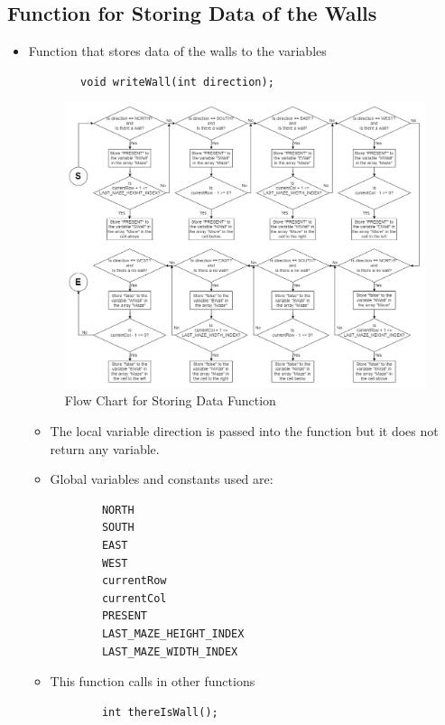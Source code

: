 \documentclass[11pt]{article}
\begin{document}
\subsection{Function for Storing Data of the Walls}
\begin{itemize}
\item Function that stores data of the walls to the variables
	\begin{verbatim}
		void writeWall(int direction);
	\end{verbatim}
\begin{figure}[htp]
\centering
\includegraphics[scale=0.4]{images/Software_Flowchart/writeWall.png}
\caption{Flow Chart for Storing Data Function}
\label{}
\end{figure}
	\begin{itemize}
	\item The local variable direction is passed into the function but it does not return any variable.
	\item Global variables and constants used are:
	\begin{verbatim}
		NORTH
		SOUTH
		EAST
		WEST
		currentRow
		currentCol
		PRESENT
		LAST_MAZE_HEIGHT_INDEX
		LAST_MAZE_WIDTH_INDEX
	\end{verbatim}
	\item This function calls in other functions 
	\begin{verbatim}
		int thereIsWall();
	\end{verbatim}
	\end{itemize}
\end{itemize}
\newpage
\end{document}
